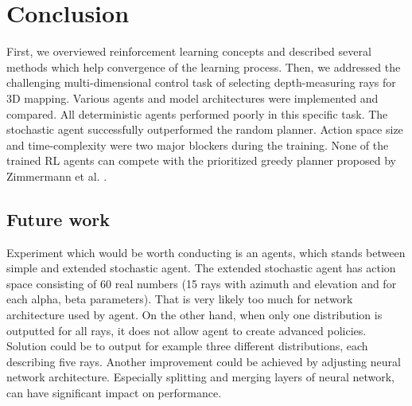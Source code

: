 \section{Conclusion}
First, we overviewed reinforcement learning concepts and described several methods which help convergence of the learning process. Then, we addressed the challenging multi-dimensional control task of selecting depth-measuring rays for 3D mapping. Various agents and model architectures were implemented and compared. All deterministic agents performed poorly in this specific task. The stochastic agent successfully outperformed the random planner. Action space size and time-complexity were two major blockers during the training. None of the trained RL agents can compete with the prioritized greedy planner proposed by Zimmermann et al. \cite{zimmermann2017}.


\subsection{Future work}
Experiment which would be worth conducting is an agents, which stands between simple and extended stochastic agent. The extended stochastic agent has action space consisting of 60 real numbers (15 rays with azimuth and elevation and for each alpha, beta parameters). That is very likely too much for network architecture used by agent. On the other hand, when only one distribution is outputted for all rays, it does not allow agent to create advanced policies. Solution could be to output for example three different distributions, each describing five rays. Another improvement could be achieved by adjusting neural network architecture. Especially splitting and merging layers of neural network, can have significant impact on performance. 
